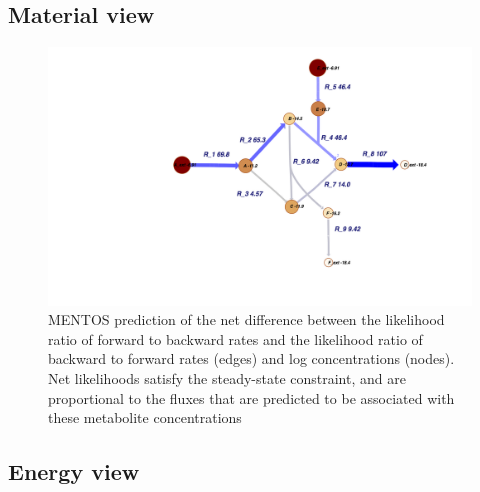 \documentclass[10pt]{article}
\begin{document}
\subsection{Material view}

{\label{869083}}\par\null\par\null{}
\begin{figure}[h!]
\begin{center}
\includegraphics[width=1.00\columnwidth]{figures/ABC-material-view/ABC_material_view}
\caption{{MENTOS prediction of the net difference between the likelihood ratio of
forward to backward rates and the likelihood ratio of backward to
forward rates (edges) and log concentrations (nodes).~ Net likelihoods
satisfy the steady-state constraint, and are proportional to the fluxes
that are predicted to be associated with these metabolite concentrations
{\label{281473}}%
}}
\end{center}
\end{figure}

\par\null

\subsection{Energy view}
\end{document}
